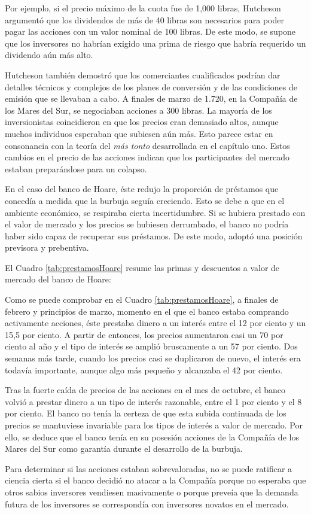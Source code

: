 Por ejemplo, si el precio máximo de la cuota fue de 1,000 libras, Hutcheson argumentó que los dividendos de más de 40 libras son necesarios para poder pagar las acciones con un valor nominal de 100 libras. De este modo, se supone que los inversores no habrían exigido una prima de riesgo que habría requerido un dividendo aún más alto. 

Hutcheson también demostró que los comerciantes cualificados podrían dar detalles técnicos y complejos de los planes de conversión y de las condiciones de emisión que se llevaban a cabo. A finales de marzo de 1.720, en la Compañía de los Mares del Sur, se negociaban acciones a 300 libras. La mayoría de los inversionistas coincidieron en que los precios eran demasiado altos, aunque muchos individuos esperaban que subiesen aún más. Esto parece estar en consonancia con la teoría del \emph{más tonto} desarrollada en el capítulo uno.  Estos cambios en el precio de las acciones indican que los participantes del mercado estaban preparándose para un colapso.

En el caso del banco de Hoare, éste redujo la proporción de préstamos que concedía a medida que la burbuja seguía creciendo. Esto se debe a que en el ambiente económico, se respiraba cierta incertidumbre. Si se hubiera prestado con el valor de mercado y los precios se hubiesen derrumbado, el banco no podría haber sido capaz de recuperar sus préstamos. De este modo, adoptó una posición previsora y prebentiva. 

El Cuadro \ref{tab:prestamosHoare} resume las primas y descuentos a valor de mercado del banco de Hoare:



Como se puede comprobar en el Cuadro \ref{tab:prestamosHoare}, a finales de febrero y principios de marzo, momento en el que el banco estaba comprando activamente acciones, éste prestaba dinero a un interés entre el 12 por ciento y un 15,5 por ciento. A partir de entonces, los precios aumentaron casi un 70 por ciento al año y el tipo de interés se amplió bruscamente a un 57 por ciento. Dos semanas más tarde, cuando los precios casi se duplicaron de nuevo, el interés era todavía importante, aunque algo más pequeño y alcanzaba el 42 por ciento.

Tras la fuerte caída de precios de las acciones en el mes de octubre, el banco volvió a prestar dinero a un tipo de interés razonable, entre el 1 por ciento y el 8 por ciento. El banco no tenía la certeza de que esta subida continuada de los precios se mantuviese invariable para los tipos de interés a valor de mercado. Por ello, se deduce que el banco tenía en su posesión acciones de la Compañía de los Mares del Sur como garantía durante el desarrollo de la burbuja.

Para determinar si las acciones estaban sobrevaloradas, no se puede ratificar a ciencia cierta si el banco decidió no atacar a la Compañía porque no esperaba que otros sabios inversores vendiesen masivamente o porque preveía que la demanda futura de los inversores se correspondía con inversores novatos en el mercado.

